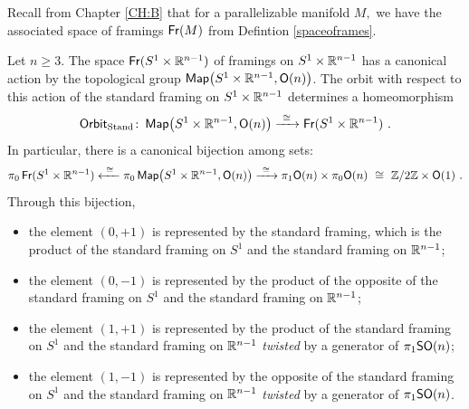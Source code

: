 Recall from Chapter \ref{CH:B} that for a parallelizable manifold $M,$ we have the associated space of framings $\operatorname{\sf Fr}(M)$ from Defintion \ref{spaceoframes}.

\begin{observation}
\label{t6uni}
Let $n \geq 3$.
The space $\operatorname{\sf Fr}(S^1\times \mathbb R^{n-1})$ of framings on $S^1\times \mathbb R^{n-1}$ has a canonical action by the topological group $\operatorname{{\sf Map}}\bigl(S^1\times \mathbb R^{n-1} , \mathsf O(n) \bigr)$.
The orbit with respect to this action of the standard framing on $S^1\times \mathbb R^{n-1}$ determines a homeomorphism
\[
{\sf Orbit}_{\rm Stand}
\colon
\operatorname{{\sf Map}}\bigl(S^1\times \mathbb R^{n-1} , \mathsf O(n) \bigr)
\xrightarrow{~\cong~}
\operatorname{\sf Fr}(S^1\times \mathbb R^{n-1})
~.
\]
In particular, there is a canonical bijection among sets:
\[
\pi_0
\operatorname{\sf Fr}(S^1\times \mathbb R^{n-1})
\xleftarrow{~\cong~}
\pi_0
\operatorname{{\sf Map}}\bigl(S^1\times \mathbb R^{n-1} , \mathsf O(n) \bigr)
\xrightarrow{~\cong~}
\pi_1 \mathsf O(n) 
\times
\pi_0 \mathsf O(n) 
~\cong~
\mathbb Z/2\mathbb Z
\times
\mathsf O(1)
~.
\]
Through this bijection, 
\begin{itemize}
\item
the element $(0,+1)$ is represented by the standard framing, which is the product of the standard framing on $S^1$ and the standard framing on $\mathbb R^{n-1}$;


\item
the element $(0,-1)$ is represented by the product of the opposite of the standard framing on $S^1$ and the standard framing on $\mathbb R^{n-1}$;

\item
the element $(1,+1)$ is represented by the product of the standard framing on $S^1$ and the standard framing on $\mathbb R^{n-1}$ \emph{twisted} by a generator of $\pi_1{\sf SO}(n)$;

\item
the element $(1,-1)$ is represented by the opposite of the standard framing on $S^1$ and the standard framing on $\mathbb R^{n-1}$ \emph{twisted} by a generator of $\pi_1{\sf SO}(n)$.


\end{itemize}
\end{observation}


